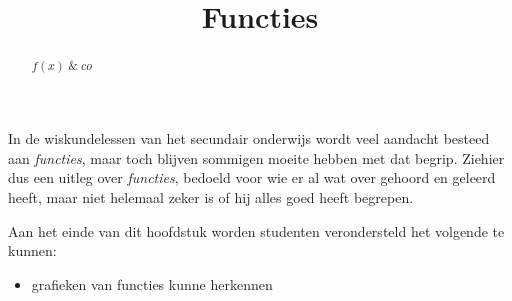 \documentclass{ximera}
\title{Functies}
\begin{document}
\begin{abstract}
$f(x)  \;\&\; co$ 
\end{abstract}

\maketitle

  
In de wiskundelessen van het secundair onderwijs wordt veel aandacht besteed aan \textit{functies}, maar toch blijven sommigen moeite hebben met dat begrip. 
Ziehier dus een uitleg over \textit{functies}, bedoeld voor wie er al wat over gehoord en geleerd heeft, maar niet helemaal zeker is of hij alles goed heeft begrepen.


\begin{sectionOutcomes}

Aan het einde van dit hoofdstuk worden studenten verondersteld het volgende te kunnen:

\begin{itemize}
\item grafieken van functies kunne herkennen
\end{itemize}

\end{sectionOutcomes}
\end{document}

